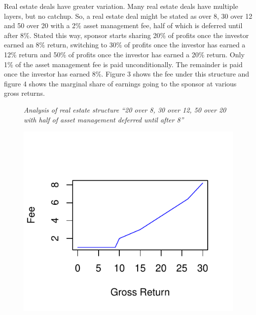 \documentclass[12pt,english]{article}\usepackage[]{graphicx}\usepackage[]{color}
\makeatletter
\def\maxwidth{ %
  \ifdim\Gin@nat@width>\linewidth
    \linewidth
  \else
    \Gin@nat@width
  \fi
}
\newenvironment{knitrout}{}{} %
\makeatother
\begin{document}
Real estate deals have greater variation. Many real estate deals have
multiple layers, but no catchup. So, a real estate deal might be stated
as  over 8, 30 over 12 and 50 over 20 with a 2\%
asset management fee, half of which is deferred until after 8\%\textquotedbl .
Stated this way, sponsor starts sharing 20\% of profits once the investor
earned an 8\% return, switching to 30\% of profits once the investor
has earned a 12\% return and 50\% of profits once the investor has
earned a 20\% return. Only 1\% of the asset management fee is paid
unconditionally. The remainder is paid once the investor has earned
8\%. Figure 3 shows the fee under this structure and figure 4 shows
the marginal share of earnings going to the sponsor at various gross
returns.



\begin{figure}[h]
\emph{Analysis of real estate structure ``20 over 8, 30 over 12,
50 over 20 with half of asset management deferred until after 8''}

\begin{minipage}[t]{0.45\columnwidth}%
\begin{knitrout}
\color{fgcolor}
\includegraphics[width=\maxwidth]{figure/pe9-1} 

\end{knitrout}


\end{minipage}
\end{figure}
\end{document}

